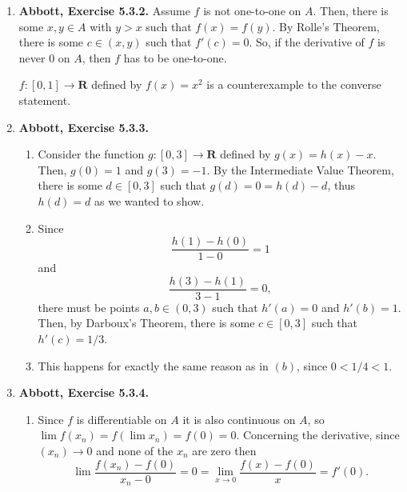 \documentclass{article}
\makeatletter
\DeclarePairedDelimiter\abs{\lvert}{\rvert}
\let\oldabs\abs
\def\abs{\@ifstar{\oldabs}{\oldabs*}}
\newcommand{\R}{\mathbf{R}}
\newcommand{\exc}[2][Abbott]{\item \textbf{#1, Exercise #2.}}
\let\oldmax\max
\renewcommand{\max}[1]{\oldmax \left( #1 \right)}
\makeatother
\begin{document}
\begin{enumerate}
\begin{enumerate}
        \item Since $f'$ is continuous on the compact set $[a, b]$, it must attain a maximum value at some $c_1 \in [a, b]$ and a minimum value at $c_2 \in [a, b]$. Set $\alpha := \max{\abs{f'(c_1)}, \abs{f'(c_2)}, 0.5}$ and notice that $\alpha < 1$ by assumption . Now, consider some $x, y \in [a, b]$ with $y > x$. By the Mean Value Theorem, there is some $p \in (a, b)$ such that 
        \begin{equation*}
            \abs{\frac{f(x)-f(y)}{x-y}} = \abs{f'(p)} \leq \alpha.
        \end{equation*} Since $1 > \alpha > 0$, $f$ is contractive on $[a, b]$.
    \end{enumerate}
    
    \exc{5.3.2}
    Assume $f$ is not one-to-one on $A$. Then, there is some $x,y \in A$ with $y > x$ such that $f(x) = f(y)$. By Rolle's Theorem, there is some $c \in (x, y)$ such that $f'(c) = 0$. So, if the derivative of $f$ is never $0$ on $A$, then $f$ has to be one-to-one.
    
    $f: [0, 1] \to \R$ defined by $f(x) = x^2$ is a counterexample to the converse statement.
    
    \exc{5.3.3}
    \begin{enumerate}
        \item Consider the function $g:[0,3] \to \R$ defined by $g(x) = h(x)-x$. Then, $g(0) = 1$ and $g(3) = -1$. By the Intermediate Value Theorem, there is some $d \in [0, 3]$ such that $g(d) = 0 = h(d)-d$, thus $h(d) = d$ as we wanted to show.
        
        \item Since 
        \begin{equation*}
            \frac{h(1)-h(0)}{1-0} = 1
        \end{equation*} and 
        \begin{equation*}
            \frac{h(3)-h(1)}{3-1} = 0,
        \end{equation*} there must be points $a,b \in (0, 3)$ such that $h'(a) = 0$ and $h'(b) = 1$. Then, by Darboux's Theorem, there is some $c \in [0, 3]$ such that $h'(c) = 1/3$.
        
        \item This happens for exactly the same reason as in $(b)$, since $0 < 1/4 < 1$.
    \end{enumerate}
    
    \newpage
    \exc{5.3.4}
    \begin{enumerate}
        \item Since $f$ is differentiable on $A$ it is also continuous on $A$, so $\lim f(x_n) = f(\lim x_n) = f(0) = 0$. Concerning the derivative, since $(x_n) \to 0$ and none of the $x_n$ are zero then 
        \begin{equation*}
            \lim \frac{f(x_n)-f(0)}{x_n-0} = 0 = \lim_{x \to 0} \frac{f(x)-f(0)}{x} = f'(0).
        \end{equation*}
        

\end{enumerate}
\end{enumerate}
\end{document}
